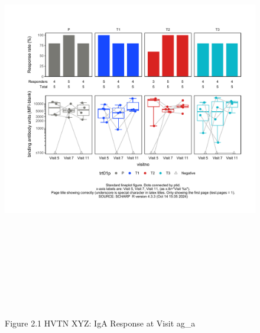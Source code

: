 \documentclass[12pt]{article}
\begin{document}
\begin{figure}[H]

{\centering \includegraphics[width=8.75in,height=7.25in]{test_cases_files/figure-latex/unnamed-chunk-4-1} 

}

\caption[Figure 2.1 lineplot (pos. response boxplots)]{Figure 2.1 HVTN XYZ: IgA Response at Visit ag\_a}\label{fig:unnamed-chunk-4}
\end{figure}
\clearpage
\end{document}
